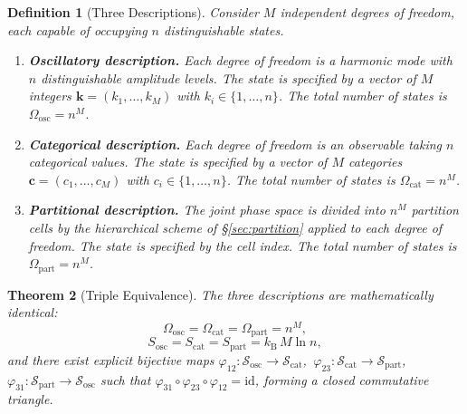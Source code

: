 \documentclass[11pt,twocolumn,a4paper]{article}
\newtheorem{theorem}{Theorem}[section]
\newtheorem{definition}[theorem]{Definition}
\newcommand{\kb}{k_{\mathrm{B}}}
\begin{document}
\begin{definition}[Three Descriptions]
\label{def:three-descriptions}
Consider $M$ independent degrees of freedom, each capable of
occupying $n$ distinguishable states.
\begin{enumerate}[label=(\roman*),leftmargin=*]
\item \textbf{Oscillatory description.} Each degree of freedom is
  a harmonic mode with $n$ distinguishable amplitude levels. The
  state is specified by a vector of $M$ integers
  $\bm{k} = (k_1, \ldots, k_M)$ with $k_i \in \{1, \ldots, n\}$.
  The total number of states is $\Omega_{\mathrm{osc}} = n^M$.
\item \textbf{Categorical description.} Each degree of freedom is
  an observable taking $n$ categorical values. The state is specified
  by a vector of $M$ categories
  $\bm{c} = (c_1, \ldots, c_M)$ with $c_i \in \{1, \ldots, n\}$.
  The total number of states is $\Omega_{\mathrm{cat}} = n^M$.
\item \textbf{Partitional description.} The joint phase space is
  divided into $n^M$ partition cells by the hierarchical scheme
  of \S\ref{sec:partition} applied to each degree of freedom.
  The state is specified by the cell index.
  The total number of states is $\Omega_{\mathrm{part}} = n^M$.
\end{enumerate}
\end{definition}

\begin{theorem}[Triple Equivalence]
\label{thm:triple}
The three descriptions are mathematically identical:
\begin{equation}
\Omega_{\mathrm{osc}} = \Omega_{\mathrm{cat}}
  = \Omega_{\mathrm{part}} = n^{M},
\label{eq:triple-omega}
\end{equation}
\begin{equation}
S_{\mathrm{osc}} = S_{\mathrm{cat}} = S_{\mathrm{part}}
  = \kb \, M \ln n,
\label{eq:triple-S}
\end{equation}
and there exist explicit bijective maps
$\varphi_{12} : \mathcal{S}_{\mathrm{osc}} \to
\mathcal{S}_{\mathrm{cat}}$,\,
$\varphi_{23} : \mathcal{S}_{\mathrm{cat}} \to
\mathcal{S}_{\mathrm{part}}$,\,
$\varphi_{31} : \mathcal{S}_{\mathrm{part}} \to
\mathcal{S}_{\mathrm{osc}}$
such that $\varphi_{31} \circ \varphi_{23} \circ \varphi_{12} =
\mathrm{id}$, forming a closed commutative triangle.
\end{theorem}
\end{document}
